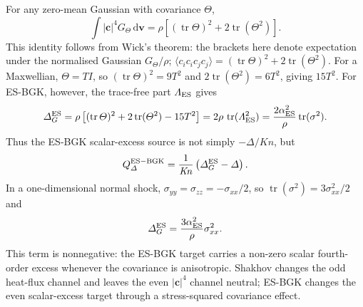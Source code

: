 \documentclass[lineno,paper]{JFM-FLM_Au}
\newenvironment{revision}{\nolinenumbers\begin{tcolorbox}[breakable,colback=revisionyellow,colframe=revisionyellow,boxrule=0pt,arc=0pt,left=5pt,right=5pt,top=5pt,bottom=5pt,before skip=6pt,after skip=6pt]\captionsetup{width=\linewidth}}{\end{tcolorbox}\linenumbers}
\newenvironment{revision}{}{}
\newcommand{\Kn}{\mathit{Kn}}
\newcommand{\dd}{\mathrm{d}}
\newcommand{\tr}{\operatorname{tr}}
\begin{document}
\begin{revision}
For any zero-mean Gaussian with covariance $\Theta$,
\begin{equation}
  \int |\boldsymbol c|^4G_\Theta\,\dd\boldsymbol v
  =\rho\left[(\tr\Theta)^2+2\tr(\Theta^2)\right].
  \label{eq:es_fourth}
\end{equation}
This identity follows from Wick's theorem:
 the brackets here denote expectation under the normalised Gaussian $G_\Theta/\rho$; $\langle c_i c_i c_j c_j\rangle=(\tr\Theta)^2+2\tr(\Theta^2)$.  For a Maxwellian, $\Theta=T I$, so $(\tr\Theta)^2=9T^2$ and $2\tr(\Theta^2)=6T^2$, giving $15T^2$.  For ES-BGK, however, the trace-free part $\Lambda_{\rm ES}$ gives
\begin{equation}
  \Delta_G^{\rm ES}
  =\rho\left[(\tr\Theta)^2+2\tr(\Theta^2)-15T^2\right]
  =2\rho\,\tr(\Lambda_{\rm ES}^2)
  =\frac{2\alpha_{\rm ES}^2}{\rho}\tr(\sigma^2).
  \label{eq:es_delta_target}
\end{equation}
Thus the ES-BGK scalar-excess source is not simply $-\Delta/\Kn$, but
\begin{equation}
  Q_\Delta^{\rm ES-BGK}
  =\frac{1}{\Kn}\left(\Delta_G^{\rm ES}-\Delta\right) .
  \label{eq:es_delta_source}
\end{equation}
In a one-dimensional normal shock, $\sigma_{yy}=\sigma_{zz}=-\sigma_{xx}/2$, so $\tr(\sigma^2)=3\sigma_{xx}^2/2$ and
\begin{equation}
  \Delta_G^{\rm ES}=\frac{3\alpha_{\rm ES}^2}{\rho}\sigma_{xx}^2 .
  \label{eq:es_1d_delta_target}
\end{equation}
This term is nonnegative: the ES-BGK target carries a non-zero scalar fourth-order excess whenever the covariance is anisotropic.  Shakhov changes the odd heat-flux channel and leaves the even $|\boldsymbol c|^4$ channel neutral; ES-BGK changes the even scalar-excess target through a stress-squared covariance effect.
\end{revision}
\end{document}
